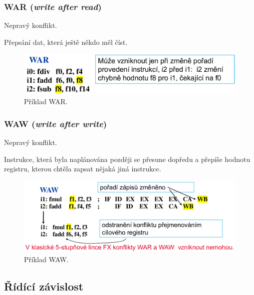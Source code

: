 \subsubsection{WAR (\textit{write after read})}
\begin{compactitem}
    \item Nepravý konflikt.
    \item Přepsání dat, která ještě někdo měl číst.

    \begin{figure}[H]
        \centering
        \includegraphics[width=0.8\linewidth]{war.pdf}
        \caption{Příklad WAR.}
    \end{figure}
\end{compactitem}

\subsubsection{WAW (\textit{write after write})}
\begin{compactitem}
    \item Nepravý konflikt.
    \item Instrukce, která byla naplánována později se přesune dopředu a přepíše hodnotu registru, kterou chtěla zapsat nějaká jiná instrukce.

    \begin{figure}[H]
        \centering
        \includegraphics[width=0.8\linewidth]{waw.pdf}
        \caption{Příklad WAW.}
    \end{figure}
\end{compactitem}

\subsection{Řídící závislost}

